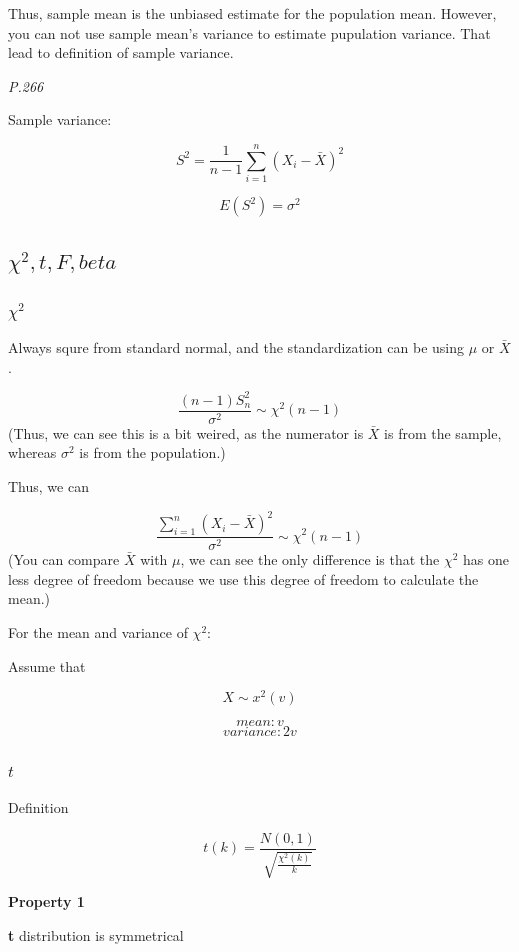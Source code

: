 \documentclass[
]{book}
\begin{document}
Thus, sample mean is the unbiased estimate for the population mean. However, you can not use sample mean's variance to estimate pupulation variance. That lead to definition of sample variance.

\emph{P.266}

Sample variance:

\[S^2=\frac{1}{n-1}\sum_{i=1}^n(X_i-\bar{X})^2\]

\[E(S^2)=\sigma^2\]

\hypertarget{chi2-t-f-beta}{%
\subsection{\texorpdfstring{\(\chi^2, t, F, beta\)}{\textbackslash chi\^{}2, t, F, beta}}\label{chi2-t-f-beta}}

\hypertarget{chi2}{%
\subsubsection{\texorpdfstring{\(\chi^2\)}{\textbackslash chi\^{}2}}\label{chi2}}

Always squre from standard normal, and the standardization can be using \(\mu\) or \(\bar{X}\).

\[\frac{(n-1)S_n^2}{\sigma^2} \sim \chi^2(n-1)\]
(Thus, we can see this is a bit weired, as the numerator is \(\bar{X}\) is from the sample, whereas \(\sigma^2\) is from the population.)

Thus, we can

\[\frac{\sum_{i=1}^n(X_i-\bar{X})^2}{\sigma^2}\sim \chi^2(n-1)\]
(You can compare \(\bar{X}\) with \(\mu\), we can see the only difference is that the \(\chi^2\) has one less degree of freedom because we use this degree of freedom to calculate the mean.)

For the mean and variance of \(\chi^2\):

Assume that

\[X \sim x^2(v)\]

\[mean:v\]
\[variance: 2v\]

\hypertarget{t}{%
\subsubsection{\texorpdfstring{\(t\)}{t}}\label{t}}

Definition

\[t(k)=\frac{N(0,1)}{\sqrt{\frac{\chi^2(k)}{k}}}\]

\textbf{Property 1}

\textbf{t} distribution is symmetrical
\end{document}
